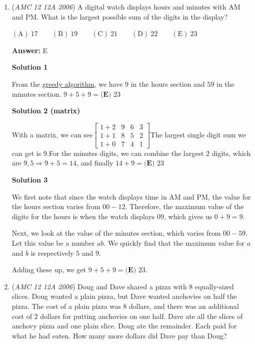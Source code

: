 \begin{enumerate}
\textbf{Solution 2}

We can see this is a combined ratio of $8$, $(5+3)$. We can equalize by doing $30\div5=6$, and $6\cdot3=\boxed{\textbf{(B) }18}$. With the common ratio of $8$ and difference ratio of $6$, we see $6\cdot8=30+18$. Therefore, we can see our answer is correct.

 


	\item (\textit{AMC 12 12A 2006}) A digital watch displays hours and minutes with AM and PM. What is the largest possible sum of the digits in the display?


 $\mathrm{(A) \ } 17\qquad \mathrm{(B) \ } 19\qquad \mathrm{(C) \ } 21\qquad \mathrm{(D) \ } 22\qquad \mathrm{(E) \ }  23$

 \textbf{Answer: }E



\textbf{Solution 1}

From the \href{https://artofproblemsolving.com/wiki/index.php?title=Greedy\_algorithm}{greedy algorithm}, we have $9$ in the hours section and $59$ in the minutes section. $9+5+9=\boxed{\textbf{(E) }23}$




\textbf{Solution 2 (matrix)}

With a matrix, we can see$\begin{bmatrix} 1+2&9&6&3\\ 1+1&8&5&2\\ 1+0&7&4&1 \end{bmatrix}$The largest single digit sum we can get is $9$.For the minutes digits, we can combine the largest $2$ digits, which are $9,5 \Rightarrow 9+5=14$, and finally $14+9=\boxed{\textbf{(E) }23}$




\textbf{Solution 3}

We first note that since the watch displays time in AM and PM, the value for the hours section varies from $00-12$. Therefore, the maximum value of the digits for the hours is when the watch displays $09$, which gives us $0+9=9$.

 Next, we look at the value of the minutes section, which varies from $00-59$. Let this value be a number $ab$. We quickly find that the maximum value for $a$ and $b$ is respectively $5$ and $9$.

 Adding these up, we get $9+5+9=\boxed{\textbf{(E) }23}$.

 


	\item (\textit{AMC 12 12A 2006}) Doug and Dave shared a pizza with $8$ equally-sized slices. Doug wanted a plain pizza, but Dave wanted anchovies on half the pizza. The cost of a plain pizza was $8$ dollars, and there was an additional cost of $2$ dollars for putting anchovies on one half. Dave ate all the slices of anchovy pizza and one plain slice. Doug ate the remainder. Each paid for what he had eaten. How many more dollars did Dave pay than Doug?



\end{enumerate}
